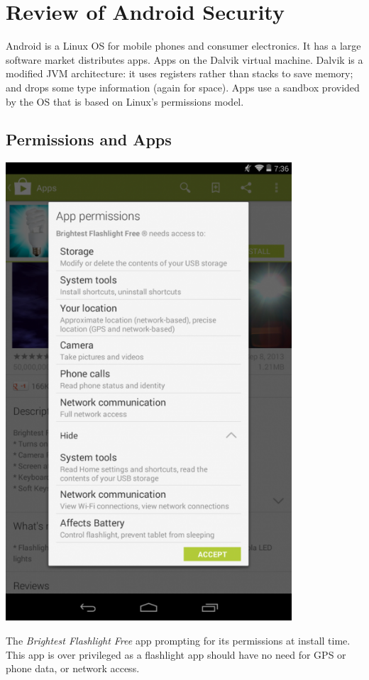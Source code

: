 \documentclass[a4paper,sfsidenotes]{tufte-book}
\begin{document}
\section{Review of Android Security}

Android is a Linux OS for mobile phones and
consumer electronics. It has a large software
market distributes apps. Apps on the Dalvik virtual machine.  Dalvik is a
modified JVM architecture: it uses registers rather than stacks to save memory;
and drops some type information (again for space).
Apps use a sandbox provided by the OS that is based on
Linux's permissions model\cite{Drake:2014uq}.

\subsection{Permissions and Apps}

\begin{marginfigure}\label{img:brightestflashlight}
  \centering
  \includegraphics[width=0.8\textwidth]{img/brightestflashlight.png}
  \caption{The \emph{Brightest Flashlight Free} app prompting for its permissions
    at install time. This app is over privileged as a flashlight app should have
    no need for GPS or phone data, or network access.}
\end{marginfigure}
\end{document}
